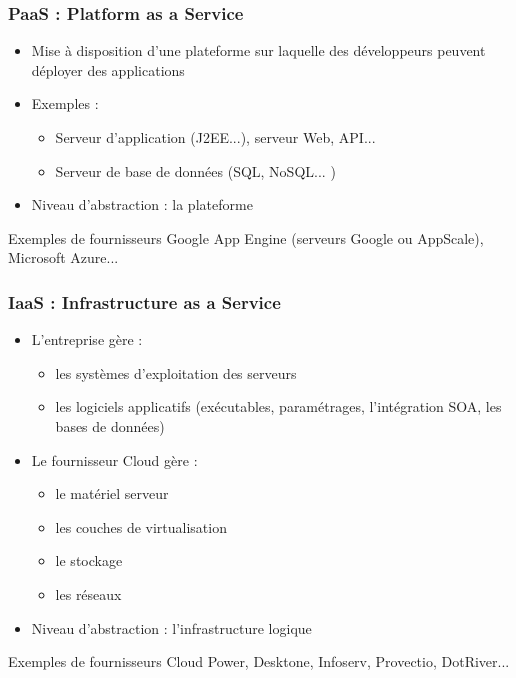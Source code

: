 \begin{frame}
\frametitle{PaaS : Platform as a Service}
\begin{itemize}
\item Mise à disposition d'une plateforme sur laquelle des développeurs peuvent déployer des applications
\item Exemples : 
\begin{itemize}
\item Serveur d'application (J2EE...), serveur Web, API...
\item Serveur de base de données (SQL, NoSQL... )
\end{itemize}
\item Niveau d'abstraction : la plateforme
\end{itemize}
\begin{exampleblock}{Exemples de fournisseurs}
Google App Engine (serveurs Google ou AppScale), Microsoft Azure...
\end{exampleblock}
\end{frame}

\begin{frame}
\frametitle{IaaS : Infrastructure as a Service}
\begin{itemize}
\item L'entreprise gère : 
\begin{itemize}
\item les systèmes d'exploitation des serveurs
\item les logiciels applicatifs (exécutables, paramétrages, l'intégration SOA, les bases de données)
\end{itemize}
\item Le fournisseur Cloud gère :
\begin{itemize}
\item le matériel serveur
\item les couches de virtualisation
\item le stockage
\item les réseaux
\end{itemize}
\item Niveau d'abstraction : l'infrastructure logique
\end{itemize}
\begin{exampleblock}{Exemples de fournisseurs}
Cloud Power, Desktone, Infoserv, Provectio, DotRiver...
\end{exampleblock}
\end{frame}

